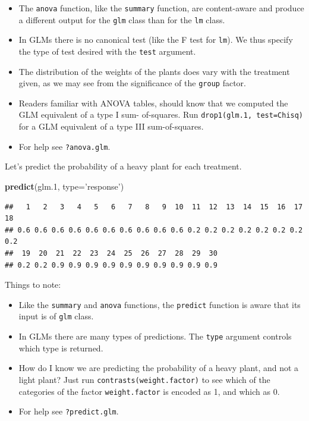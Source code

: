 \documentclass[]{book}
\newenvironment{Shaded}{\begin{snugshade}}{\end{snugshade}}
\newcommand{\KeywordTok}[1]{\textcolor[rgb]{0.13,0.29,0.53}{\textbf{{#1}}}}
\newcommand{\DataTypeTok}[1]{\textcolor[rgb]{0.13,0.29,0.53}{{#1}}}
\newcommand{\FloatTok}[1]{\textcolor[rgb]{0.00,0.00,0.81}{{#1}}}
\newcommand{\StringTok}[1]{\textcolor[rgb]{0.31,0.60,0.02}{{#1}}}
\newcommand{\NormalTok}[1]{{#1}}
\providecommand{\tightlist}{%
  \setlength{\itemsep}{0pt}\setlength{\parskip}{0pt}}
\theoremstyle{definition}
\theoremstyle{definition}
\theoremstyle{remark}
\begin{document}
\begin{itemize}
\tightlist
\item
  The \texttt{anova} function, like the \texttt{summary} function, are
  content-aware and produce a different output for the \texttt{glm}
  class than for the \texttt{lm} class.
\item
  In GLMs there is no canonical test (like the F test for \texttt{lm}).
  We thus specify the type of test desired with the \texttt{test}
  argument.
\item
  The distribution of the weights of the plants does vary with the
  treatment given, as we may see from the significance of the
  \texttt{group} factor.
\item
  Readers familiar with ANOVA tables, should know that we computed the
  GLM equivalent of a type I sum- of-squares. Run
  \texttt{drop1(glm.1,\ test=\textquotesingle{}Chisq\textquotesingle{})}
  for a GLM equivalent of a type III sum-of-squares.
\item
  For help see \texttt{?anova.glm}.
\end{itemize}

Let's predict the probability of a heavy plant for each treatment.

\begin{Shaded}
\begin{Highlighting}[]
\KeywordTok{predict}\NormalTok{(glm}\FloatTok{.1}\NormalTok{, }\DataTypeTok{type=}\StringTok{'response'}\NormalTok{)}
\end{Highlighting}
\end{Shaded}

\begin{verbatim}
##   1   2   3   4   5   6   7   8   9  10  11  12  13  14  15  16  17  18 
## 0.6 0.6 0.6 0.6 0.6 0.6 0.6 0.6 0.6 0.6 0.2 0.2 0.2 0.2 0.2 0.2 0.2 0.2 
##  19  20  21  22  23  24  25  26  27  28  29  30 
## 0.2 0.2 0.9 0.9 0.9 0.9 0.9 0.9 0.9 0.9 0.9 0.9
\end{verbatim}

Things to note:

\begin{itemize}
\tightlist
\item
  Like the \texttt{summary} and \texttt{anova} functions, the
  \texttt{predict} function is aware that its input is of \texttt{glm}
  class.
\item
  In GLMs there are many types of predictions. The \texttt{type}
  argument controls which type is returned.
\item
  How do I know we are predicting the probability of a heavy plant, and
  not a light plant? Just run \texttt{contrasts(weight.factor)} to see
  which of the categories of the factor \texttt{weight.factor} is
  encoded as 1, and which as 0.
\item
  For help see \texttt{?predict.glm}.
\end{itemize}
\end{document}

